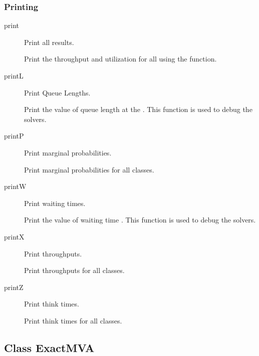 \subsubsection{Printing}
\begin{description}
\item[print] \texonly{---} Print all results.\\ 

  Print the throughput and utilization for all
   using the
   function.

\item[printL] \texonly{---} Print Queue Lengths.\\ 

  Print the value of queue length  at
  the  .  This function is
  used to debug the solvers.

\item[printP] \texonly{---} Print marginal probabilities.\\ 

  Print marginal probabilities for all classes.

\item[printW] \texonly{---} Print waiting times.\\ 

  Print the value of waiting time .
  This function is used to debug the solvers.

\item[printX] \texonly{---} Print throughputs.\\ 

  Print throughputs for all classes.

\item[printZ] \texonly{---} Print think times.\\ 

  Print think times for all classes.

\end{description}


\subsection{Class ExactMVA}
\label{sec:mva-exact}

